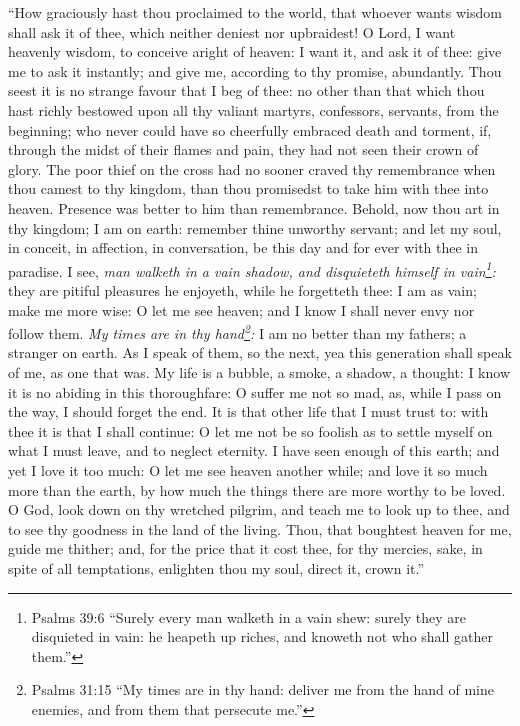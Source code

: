 ``How graciously hast thou proclaimed to the world, that whoever wants wisdom shall ask it of thee, which neither deniest nor upbraidest! O Lord, I want heavenly wisdom, to conceive aright of heaven: I want it, and ask it of thee: give me to ask it instantly; and give me, according to thy promise, abundantly. Thou seest it is no strange favour that I beg of thee: no other than that which thou hast richly bestowed upon all thy valiant martyrs, confessors, servants, from the beginning; who never could have so cheerfully embraced death and torment, if, through the midst of their flames and pain, they had not seen their crown of glory. The poor thief on the cross had no sooner craved thy remembrance when thou camest to thy kingdom, than thou promisedst to take him with thee into heaven. Presence was better to him than remembrance. Behold, now thou art in thy kingdom; I am on earth: remember thine unworthy servant; and let my soul, in conceit, in affection, in conversation, be this day and for ever with thee in paradise. I see, \emph{man walketh in a vain shadow, and disquieteth himself in vain\footnote{Psalms 39:6 ``Surely every man walketh in a vain shew: surely they are disquieted in vain: he heapeth up riches, and knoweth not who shall gather them.''}:} they are pitiful pleasures he enjoyeth, while he forgetteth thee: I am as vain; make me more wise: O let me see heaven; and I know I shall never envy nor follow them. \emph{My times are in thy hand\footnote{Psalms 31:15 ``My times are in thy hand: deliver me from the hand of mine enemies, and from them that persecute me.''}:} I am no better than my fathers; a stranger on earth. As I speak of them, so the next, yea this generation shall speak of me, as one that was. My life is a bubble, a smoke, a shadow, a thought: I know it is no abiding in this thoroughfare: O suffer me not so mad, as, while I pass on the way, I should forget the end. It is that other life that I must trust to: with thee it is that I shall continue: O let me not be so foolish as to settle myself on what I must leave, and to neglect eternity. I have seen enough of this earth; and yet I love it too much: O let me see heaven another while; and love it so much more than the earth, by how much the things there are more worthy to be loved. O God, look down on thy wretched pilgrim, and teach me to look up to thee, and to see thy goodness in the land of the living. Thou, that boughtest heaven for me, guide me thither; and, for the price that it cost thee, for thy mercies, sake, in spite of all temptations, enlighten thou my soul, direct it, crown it.''

